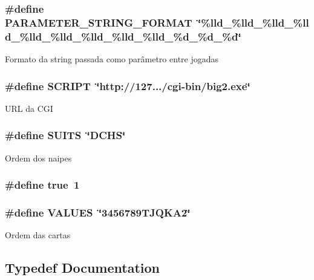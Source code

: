 \subsubsection[{P\+A\+R\+A\+M\+E\+T\+E\+R\+\_\+\+S\+T\+R\+I\+N\+G\+\_\+\+F\+O\+R\+M\+AT}]{\setlength{\rightskip}{0pt plus 5cm}\#define P\+A\+R\+A\+M\+E\+T\+E\+R\+\_\+\+S\+T\+R\+I\+N\+G\+\_\+\+F\+O\+R\+M\+AT~\char`\"{}\%lld\+\_\+\%lld\+\_\+\%lld\+\_\+\%lld\+\_\+\%lld\+\_\+\%lld\+\_\+\%lld\+\_\+\%lld\+\_\+\%lld\+\_\+\%d\+\_\+\%d\+\_\+\%d\char`\"{}}\label{_main_8c_ae3534b1edafbb19c5ca46b1687069c60}
Formato da string passada como parâmetro entre jogadas 
\subsubsection[{S\+C\+R\+I\+PT}]{\setlength{\rightskip}{0pt plus 5cm}\#define S\+C\+R\+I\+PT~\char`\"{}http\+://127.../cgi-\/bin/big2.\+exe\char`\"{}}\label{_main_8c_a8b953c0e577c049a57c981b7eeb6fa37}
U\+RL da C\+GI 
\subsubsection[{S\+U\+I\+TS}]{\setlength{\rightskip}{0pt plus 5cm}\#define S\+U\+I\+TS~\char`\"{}D\+C\+HS\char`\"{}}\label{_main_8c_a0c33b306c165fbae505ec5b3544c7d5d}
Ordem dos naipes 
\subsubsection[{true}]{\setlength{\rightskip}{0pt plus 5cm}\#define true~1}\label{_main_8c_a41f9c5fb8b08eb5dc3edce4dcb37fee7}
\subsubsection[{V\+A\+L\+U\+ES}]{\setlength{\rightskip}{0pt plus 5cm}\#define V\+A\+L\+U\+ES~\char`\"{}3456789\+T\+J\+Q\+K\+A2\char`\"{}}\label{_main_8c_a4b61441e73c1f41f6e5bfa9e3c3e8580}
Ordem das cartas 

\subsection{Typedef Documentation}
